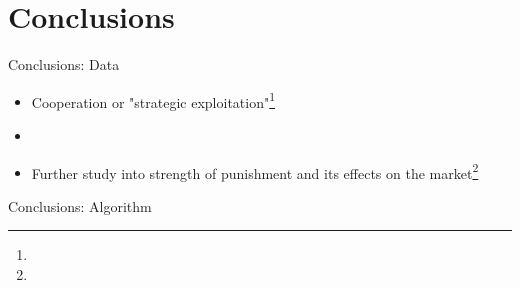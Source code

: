 \documentclass{beamer}
\begin{document}
\section{Conclusions}
\begin{frame}{Conclusions: Data}
\begin{itemize}
    \item Cooperation or "strategic exploitation"\footnote{}
    \item 
    \item Further study into strength of punishment and its effects on the market\footnote{}
\end{itemize}
\end{frame}

\begin{frame}{Conclusions: Algorithm}

\end{frame}
\end{document}

